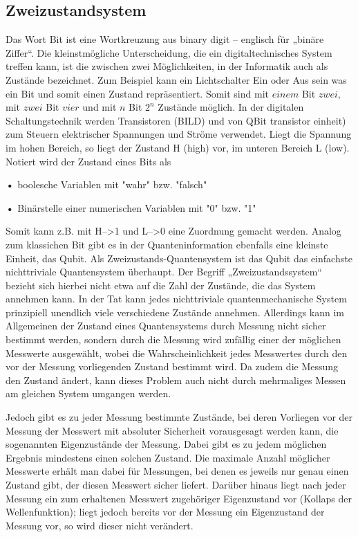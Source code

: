 \documentclass[a4paper,10pt]{scrartcl}
\begin{document}
\subsection{Zweizustandsystem}
Das Wort Bit ist eine Wortkreuzung aus binary digit – englisch für „binäre Ziffer“. Die kleinstmögliche Unterscheidung, die ein digitaltechnisches System treffen kann, ist die zwischen zwei Möglichkeiten, in der Informatik auch als Zustände bezeichnet. 
Zum Beispiel kann ein Lichtschalter Ein oder Aus sein was ein Bit und somit einen Zustand repräsentiert. Somit sind mit $einem$ Bit $zwei$, mit $zwei$ Bit $vier$ und mit $n$ Bit $2^n$ Zustände möglich. 
In der digitalen Schaltungstechnik werden Transistoren (BILD) und von QBit transistor einheit) zum Steuern elektrischer Spannungen und Ströme verwendet. Liegt die Spannung im hohen Bereich, so liegt der Zustand H (high) vor, im unteren Bereich L (low).
Notiert wird der Zustand eines Bits als

\textbf{•} boolesche Variablen mit "wahr" bzw. "falsch"

\textbf{•} Binärstelle einer numerischen Variablen mit "0" bzw. "1"

Somit kann z.B. mit H-->1 und L-->0 eine Zuordnung gemacht werden.
\vspace{5mm}
Analog zum klassichen Bit gibt es in der Quanteninformation ebenfalls eine kleinste Einheit, das Qubit. Als Zweizustands-Quantensystem ist das Qubit das einfachste nichttriviale Quantensystem überhaupt. Der Begriff „Zweizustandssystem“ bezieht sich hierbei nicht etwa auf die Zahl der Zustände, die das System annehmen kann. In der Tat kann jedes nichttriviale quantenmechanische System prinzipiell unendlich viele verschiedene Zustände annehmen. Allerdings kann im Allgemeinen der Zustand eines Quantensystems durch Messung nicht sicher bestimmt werden, sondern durch die Messung wird zufällig einer der möglichen Messwerte ausgewählt, wobei die Wahrscheinlichkeit jedes Messwertes durch den vor der Messung vorliegenden Zustand bestimmt wird. Da zudem die Messung den Zustand ändert, kann dieses Problem auch nicht durch mehrmaliges Messen am gleichen System umgangen werden.

Jedoch gibt es zu jeder Messung bestimmte Zustände, bei deren Vorliegen vor der Messung der Messwert mit absoluter Sicherheit vorausgesagt werden kann, die sogenannten Eigenzustände der Messung. Dabei gibt es zu jedem möglichen Ergebnis mindestens einen solchen Zustand. Die maximale Anzahl möglicher Messwerte erhält man dabei für Messungen, bei denen es jeweils nur genau einen Zustand gibt, der diesen Messwert sicher liefert. Darüber hinaus liegt nach jeder Messung ein zum erhaltenen Messwert zugehöriger Eigenzustand vor (Kollaps der Wellenfunktion); liegt jedoch bereits vor der Messung ein Eigenzustand der Messung vor, so wird dieser nicht verändert.
\end{document}
